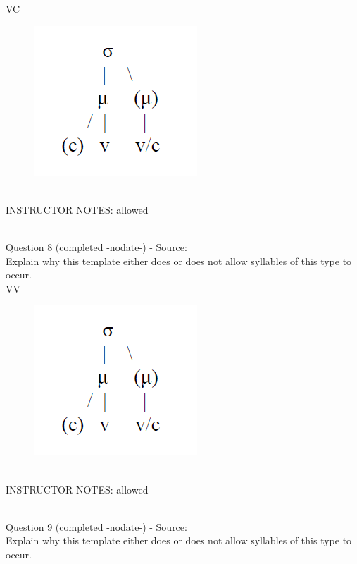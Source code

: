 \documentclass[12pt]{article}
\begin{document}
VC

\begin{figure}[H]
\includegraphics{../images/ponapean_syllabletemplate.png}
\end{figure}

~\\
INSTRUCTOR NOTES: allowed


~\\

{\large Question 8} (completed -nodate-) - Source: \\

Explain why this template either does or does not allow syllables of this type to occur.\\

VV

\begin{figure}[H]
\includegraphics{../images/ponapean_syllabletemplate.png}
\end{figure}

~\\
INSTRUCTOR NOTES: allowed


~\\

{\large Question 9} (completed -nodate-) - Source: \\

Explain why this template either does or does not allow syllables of this type to occur.\\
\end{document}
